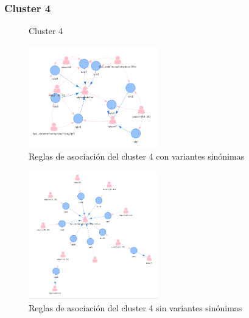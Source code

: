 \subsubsection*{Cluster 4}
\begin{figure}[H]
	\centering
	\caption{Cluster 4} \label{fig:c4}
\end{figure}

\begin{figure}[H]
	\centering
	\includegraphics[width=0.5\textwidth]{Kap4/reglas4_1}
	\caption{Reglas de asociación del cluster 4 con variantes sinónimas} \label{fig:r4}
\end{figure}

\begin{figure}[H]
	\centering
	\includegraphics[width=0.5\textwidth]{Kap4/reglas4_2}
	\caption{Reglas de asociación del cluster 4 sin variantes sinónimas} \label{fig:re4}
\end{figure}

